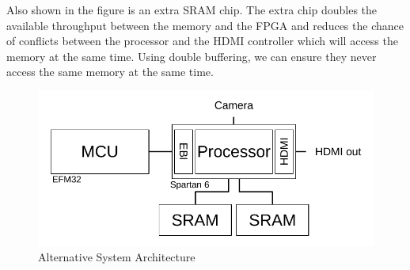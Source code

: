 Also shown in the figure is an extra SRAM chip.
The extra chip doubles the available throughput between the memory and the FPGA and reduces the chance of conflicts between the processor and the HDMI controller which will access the memory at the same time. Using double buffering, we can ensure they never access the same memory at the same time.

\begin{figure}
    \includegraphics{img/SystemArchitectureAlternative.pdf}
    \caption{Alternative System Architecture}
    \label{fig:SystemArchitectureAlternative}
\end{figure}
